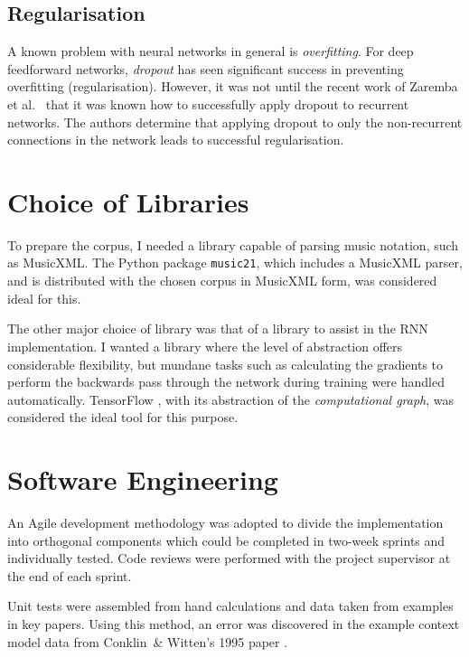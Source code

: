 \documentclass[12pt,a4paper,twoside,openright]{report}
\begin{document}
\subsection{Regularisation}

A known problem with neural networks in general is \emph{overfitting}. For deep
feedforward networks, \emph{dropout} \cite{srivastava2014dropout} has seen
significant success in preventing overfitting (regularisation). However, it was
not until the recent work of Zaremba et al.\ \cite{zaremba2014recurrent} that it
was known how to successfully apply dropout to recurrent networks. The authors
determine that applying dropout to only the non-recurrent connections in the
network leads to successful regularisation. 

\section{Choice of Libraries}

To prepare the corpus, I needed a library capable of parsing music notation,
such as MusicXML. The Python package \texttt{music21}, which includes a MusicXML
parser, and is distributed with the chosen corpus in MusicXML form, was
considered ideal for this. 

The other major choice of library was that of a library to assist in the RNN
implementation. I wanted a library where the level of abstraction offers
considerable flexibility, but mundane tasks such as calculating the gradients to
perform the backwards pass through the network during training were handled
automatically. TensorFlow \cite{abadi2016tensorflow}, with its abstraction of
the \emph{computational graph}, was considered the ideal tool for this purpose.

\section{Software Engineering}

An Agile development methodology was adopted to divide the implementation into
orthogonal components which could be completed in two-week sprints and
individually tested. Code reviews were performed with the project supervisor at
the end of each sprint. 

Unit tests were assembled from hand calculations and data taken from examples in
key papers. Using this method, an error was discovered in the example context
model data from Conklin\ \& Witten's 1995 paper \cite{conklin1995viewpoints}.
\end{document}
